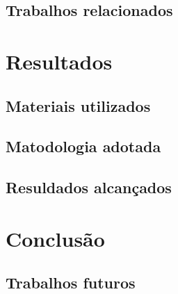 \documentclass[
    12pt,               %
    openright,          %
    oneside,            %
    a4paper,            %
    english,            %
    french,             %
    spanish,            %
    brazil              %
    ]{abntex2}
\begin{document}
\section{Trabalhos relacionados}

\chapter{Resultados}

\section{Materiais utilizados}

\section{Matodologia adotada}

\section{Resuldados alcan\c cados}


\chapter[Conclusão]{Conclusão}

\section{Trabalhos futuros}
\postextual



%
%
\end{document}
